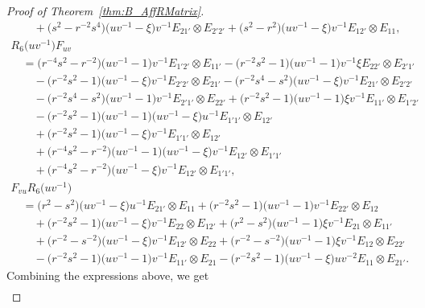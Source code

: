 \documentclass[pdftex]{sigma}
\numberwithin{equation}{section}
\begin{document}
\begin{proof}[Proof of Theorem~\ref{thm:B_AffRMatrix}]
\begin{gather*}
 \qquad{}+ \bigl(s^{2} - r^{-2}s^{4}\bigr)\bigl(uv^{-1} - \xi\bigr)v^{-1}E_{21'} \otimes E_{2'2'}+\bigl(s^{2} - r^{2}\bigr)\bigl(uv^{-1} - \xi\bigr)v^{-1}E_{12'} \otimes E_{11},
\\
 R_{6}\bigl(uv^{-1}\bigr)F_{uv} \\
 \quad{}= \bigl(r^{-4}s^{2} - r^{-2}\bigr)\bigl(uv^{-1} - 1\bigr)v^{-1}E_{1'2'} \otimes E_{11'} - \bigl(r^{-2}s^{2} - 1\bigr)\bigl(uv^{-1} - 1\bigr)v^{-1}\xi E_{22'} \otimes E_{2'1'} \\
 \qquad{}-\bigl(r^{-2}s^{2} - 1\bigr)\bigl(uv^{-1} - \xi\bigr)v^{-1}E_{2'2'} \otimes E_{21'} - \bigl(r^{-2}s^{4} - s^{2}\bigr)\bigl(uv^{-1} - \xi\bigr)v^{-1}E_{21'} \otimes E_{2'2'} \\
 \qquad{}-\bigl(r^{-2}s^{4} - s^{2}\bigr)\bigl(uv^{-1} - 1\bigr)v^{-1}E_{2'1'} \otimes E_{22'} + \bigl(r^{-2}s^{2} - 1\bigr)\bigl(uv^{-1} - 1\bigr)\xi v^{-1}E_{11'} \otimes E_{1'2'} \\
 \qquad{}-\bigl(r^{-2}s^{2} - 1\bigr)\bigl(uv^{-1} - 1\bigr)\bigl(uv^{-1} - \xi\bigr)u^{-1}E_{1'1'} \otimes E_{12'}\\
 \qquad{} + \bigl(r^{-2}s^{2} - 1\bigr)\bigl(uv^{-1} - \xi\bigr)v^{-1}E_{1'1'} \otimes E_{12'} \\
 \qquad{} +\bigl(r^{-4}s^{2} - r^{-2}\bigr)\bigl(uv^{-1} - 1\bigr)\bigl(uv^{-1} - \xi\bigr)v^{-1}E_{12'} \otimes E_{1'1'} \\
 \qquad{} + \bigl(r^{-4}s^{2} - r^{-2}\bigr)\bigl(uv^{-1} - \xi\bigr)v^{-1}E_{12'} \otimes E_{1'1'},
\\
 F_{vu}R_{6}\bigl(uv^{-1}\bigr) \\
 \quad{}= \bigl(r^{2} - s^{2}\bigr)\bigl(uv^{-1} - \xi\bigr)u^{-1}E_{21'} \otimes E_{11} + \bigl(r^{-2}s^{2} - 1\bigr)\bigl(uv^{-1} - 1\bigr)v^{-1}E_{22'} \otimes E_{12}\\
 \qquad{} +\bigl(r^{-2}s^{2} - 1\bigr)\bigl(uv^{-1} - \xi\bigr)v^{-1}E_{22} \otimes E_{12'} + \bigl(r^{2} - s^{2}\bigr)\bigl(uv^{-1} - 1\bigr)\xi v^{-1}E_{21} \otimes E_{11'} \\
 \qquad{}+\bigl(r^{-2} - s^{-2}\bigr)\bigl(uv^{-1} - \xi\bigr)v^{-1}E_{12'} \otimes E_{22} + \bigl(r^{-2} - s^{-2}\bigr)\bigl(uv^{-1} - 1\bigr)\xi v^{-1}E_{12} \otimes E_{22'} \\
 \qquad{}-\bigl(r^{-2}s^{2} - 1\bigr)\bigl(uv^{-1} - 1\bigr)v^{-1}E_{11'} \otimes E_{21} - \bigl(r^{-2}s^{2} - 1\bigr)\bigl(uv^{-1} - \xi\bigr)uv^{-2}E_{11} \otimes E_{21'}.
\end{gather*}
Combining the expressions above, we get
\begin{gather}

\end{gather}
\end{proof}
\end{document}
